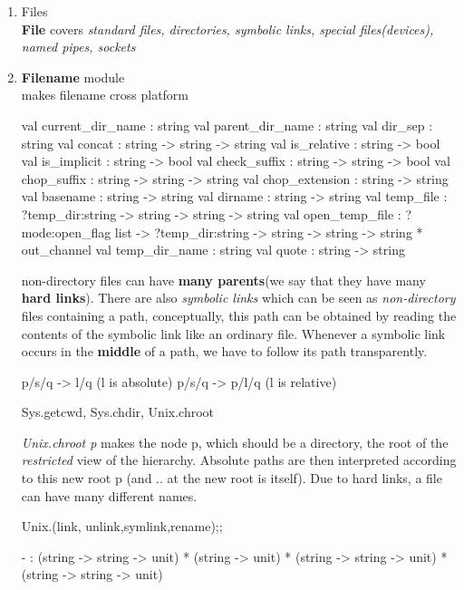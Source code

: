 \begin{enumerate}
\item Files \\
  \textbf{File} covers \textit{standard files, directories, symbolic
    links, special files(devices), named pipes, sockets}
\item \textbf{Filename}  module \\
  makes filename cross platform
  \begin{bluetext}
    val current_dir_name : string
    val parent_dir_name : string
    val dir_sep : string
    val concat : string -> string -> string
    val is_relative : string -> bool
    val is_implicit : string -> bool
    val check_suffix : string -> string -> bool
    val chop_suffix : string -> string -> string
    val chop_extension : string -> string
    val basename : string -> string
    val dirname : string -> string
    val temp_file : ?temp_dir:string -> string -> string -> string
    val open_temp_file :
      ?mode:open_flag list ->
      ?temp_dir:string -> string -> string -> string * out_channel
    val temp_dir_name : string
    val quote : string -> string
  \end{bluetext}

  non-directory files can have \textbf{many parents}(we say that they have many
  \textbf{hard links}). There are also \textit{symbolic links} which
  can be seen as \textit{non-directory} files containing a path, conceptually,
  this path can be obtained by reading the contents of the symbolic
  link like an ordinary file. Whenever a symbolic link occurs in the
  \textbf{middle} of  a path, we have to follow its path
  transparently.
  \begin{bluetext}
    p/s/q -> l/q (l is absolute)
    p/s/q -> p/l/q (l is relative)
  \end{bluetext}
  \begin{bluetext}
    Sys.getcwd, Sys.chdir, Unix.chroot
  \end{bluetext}
  \textit{Unix.chroot p} makes the node p, which should be a
  directory, the root of the \textit{restricted} view of the
  hierarchy. Absolute paths are then interpreted according to this new
  root p (and .. at the new root is itself).
  Due to hard links, a file can have many different names.

\begin{ocamlcode}
Unix.(link, unlink,symlink,rename);;
\end{ocamlcode}
\begin{ocamlcode}
- : (string -> string -> unit) * (string -> unit) *
    (string -> string -> unit) * (string -> string -> unit)    
  \end{ocamlcode}
  

\end{enumerate}
